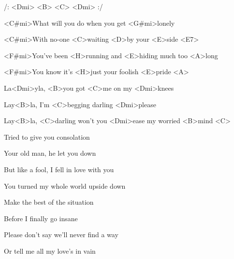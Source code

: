 

/: <Dmi> <B> <C> <Dmi> :/

\zs
<C#mi>What will you do when you get <G#mi>lonely

<C#mi>With no-one <C>waiting <D>by your <E>side <E7>

<F#mi>You've been <H>running and <E>hiding much too <A>long

<F#mi>You know it's <H>just your foolish <E>pride <A>
\ks

\zr
La<Dmi>yla, <B>you got <C>me on my <Dmi>knees

Lay<B>la, I'm <C>begging darling <Dmi>please

Lay<B>la, <C>darling won't you <Dmi>ease my worried <B>mind <C>
\kr

\zs
Tried to give you consolation

Your old man, he let you down

But like a fool, I fell in love with you

You turned my whole world upside down
\ks

\zr \kr

\zs
Make the best of the situation

Before I finally go insane

Please don't say we'll never find a way

Or tell me all my love's in vain
\ks

\zr \kr

\kp
